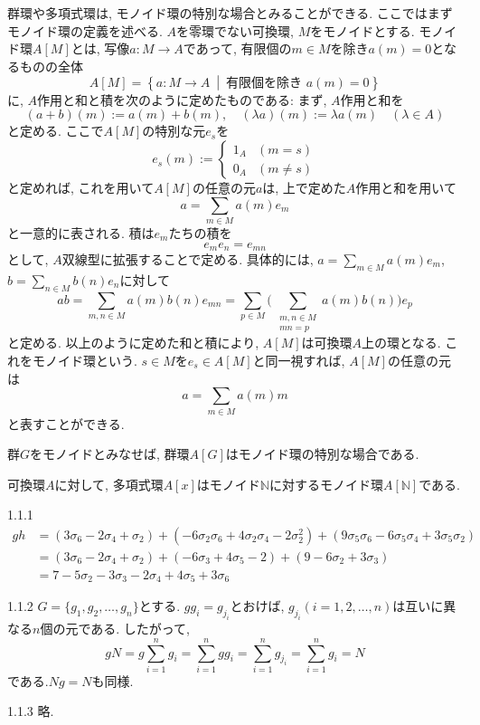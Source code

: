 \begin{supp}[モノイド環]
  群環や多項式環は, モノイド環の特別な場合とみることができる.
  ここではまずモノイド環の定義を述べる. $A$を零環でない可換環, $M$をモノイドとする. モノイド環$A[M]$とは,
  写像$a \colon M \to A$であって, 有限個の$m \in M$を除き$a(m) = 0$となるものの全体
  \[
    A[M] = \left\{ a \colon M \to A \ \middle|\ \text{有限個を除き } a(m) = 0 \right\}
  \]
  に, $A$作用と和と積を次のように定めたものである:
  まず, $A$作用と和を
  \[
    (a + b)(m) := a(m) + b(m), \quad (\lambda a)(m) := \lambda a(m) \quad (\lambda \in A)
  \]
  と定める. ここで$A[M]$の特別な元$e_s$を
  \[
    e_s(m) := \begin{cases}
      1_A & (m = s) \\
      0_A & (m \neq s)
    \end{cases}
  \]
  と定めれば, これを用いて$A[M]$の任意の元$a$は, 上で定めた$A$作用と和を用いて
  \[
    a = \sum_{m \in M} a(m) e_m
  \]
  と一意的に表される. 積は$e_m$たちの積を
  \[
    e_m e_n = e_{mn}
  \]
  として, $A$双線型に拡張することで定める. 具体的には, $a = \sum_{m \in M} a(m) e_m$, $b = \sum_{n \in M} b(n) e_n$に対して
  \[
    ab = \sum_{m,n \in M} a(m) b(n) e_{mn} = \sum_{p \in M}\Biggl(\,\sum_{\substack{m,n \in M \\ mn = p}} a(m) b(n)\Biggr) e_p
  \]
  と定める. 以上のように定めた和と積により, $A[M]$は可換環$A$上の環となる. これをモノイド環という.
  $s \in M$を$e_s \in A[M]$と同一視すれば, $A[M]$の任意の元は
  \[
    a = \sum_{m \in M} a(m) m
  \]
  と表すことができる.

  \begin{ex}
    群$G$をモノイドとみなせば, 群環$A[G]$はモノイド環の特別な場合である.
  \end{ex}
  \begin{ex}
    可換環$A$に対して, 多項式環$A[x]$はモノイド$\mathbb{N}$に対するモノイド環$A[\mathbb{N}]$である.
  \end{ex}
\end{supp}

\begin{ans}{1.1.1}
  \begin{align*}
   gh &= (3\sigma_6 - 2\sigma_4 + \sigma_2)
  + (-6\sigma_2\sigma_6 + 4\sigma_2\sigma_4 - 2\sigma_2^2)
  + (9\sigma_5\sigma_6 - 6\sigma_5\sigma_4 + 3\sigma_5\sigma_2) \\
  &= (3\sigma_6 - 2\sigma_4 + \sigma_2)
  + (-6\sigma_3 + 4\sigma_5 - 2)
  + (9 -6\sigma_2 + 3\sigma_3) \\
  &= 7 - 5\sigma_2 - 3\sigma_3 - 2\sigma_4 + 4\sigma_5 + 3\sigma_6
  \end{align*}
\end{ans}

\begin{ans}{1.1.2}
  $G = \{g_1, g_2, \dots, g_n\}$とする.
  $gg_i=g_{j_i}$とおけば, $g_{j_i} (i=1, 2, \dots, n)$は互いに異なる$n$個の元である. したがって,
  \[
    gN = g\sum_{i=1}^n g_i = \sum_{i=1}^n gg_i = \sum_{i=1}^n g_{j_i} = \sum_{i=1}^n g_i = N
  \]
  である.$Ng = N$も同様.
\end{ans}

\begin{ans}{1.1.3}
  略.
\end{ans}
